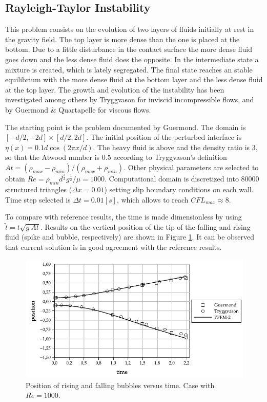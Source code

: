 \subsection{Rayleigh-Taylor Instability}

This problem consists on the evolution of two layers of fluids initially at rest in the gravity field. The top layer is more dense than the one is placed at the bottom. Due to a little disturbance in the contact surface the more dense fluid goes down and the less dense fluid does the opposite. In the intermediate state a mixture is created, which is lately segregated. The final state reaches an stable equilibrium with the more dense fluid at the bottom layer and the less dense fluid at the top layer. The growth and evolution of the instability has been investigated among others by Tryggvason\cite{Tryggvason88} for inviscid incompressible flows, and by Guermond
\& Quartapelle\cite{Guermond00} for viscous flows.

The starting point is the problem documented by Guermond. The domain is $[-d/2,-2d]\times[d/2,2d]$. The initial position of the perturbed interface is $\eta(x) = 0.1d \cos(2\pi x/d)$. The heavy fluid is above and the density ratio is $3$, so that the Atwood
number is $0.5$ according to Tryggvason's definition $At = (\rho_{max}-\rho_{min})/(\rho_{max}+\rho_{min})$. Other physical parameters are selected to obtain $Re=\rho_{min}d^{\frac{3}{2}}g^{\frac{1}{2}}/\mu=1000$. Computational domain is discretized into $80000$ structured triangles ($\Delta x=0.01$) setting slip boundary conditions on each wall. Time step selected is $\Delta t=0.01[s]$, which allows to reach $CFL_{max} \approx 8$.

To compare with reference results, the time is made dimensionless by using $\widetilde{t} = t\sqrt{g\ At}$. Results on the vertical position of the tip of the falling and rising fluid (spike and bubble, respectively) are shown in Figure \ref{fg:rayleigh-rf}. It can be observed that current solution is in good agreement with the reference results.

\begin{figure}[H]
  \begin{center}
      \includegraphics[width=\columnwidth]{images/rayleigh_1.pdf}
  \end{center}
  \caption{\label{fg:rayleigh-rf} Position of rising and falling bubbles versus time. Case with $Re=1000$.}
\end{figure}

